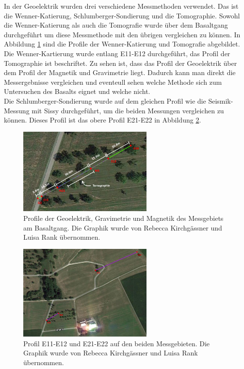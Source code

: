 
In der Geoelektrik wurden drei verschiedene Messmethoden verwendet. Das ist die Wenner-Katierung, Schlumberger-Sondierung und die Tomographie. Sowohl die Wenner-Katierung als auch die Tomografie wurde über dem Basaltgang durchgeführt um diese Messmethode mit den übrigen vergleichen zu können. In Abbildung \ref{abb:PBasalt} sind die Profile der Wenner-Katierung und Tomografie abgebildet. Die Wenner-Kartierung wurde entlang E11-E12 durchgeführt, das Profil der Tomographie ist beschriftet. Zu sehen ist, dass das Profil der Geoelektrik über dem Profil der Magnetik und Gravimetrie liegt. Dadurch kann man direkt die Messergebnisse vergleichen und eventeull sehen welche Methode sich zum Untersuchen des Basalts eignet und welche nicht.\\
Die Schlumberger-Sondierung wurde auf dem gleichen Profil wie die Seismik-Messung mit Sissy durchgeführt, um die beiden Messungen vergleichen zu können. Dieses Profil ist das obere Profil E21-E22 in Abbildung \ref{abb:PWiese}.


\begin{figure}[h]
\centering
\includegraphics[width=0.6\textwidth]{fig/ElektrikMagnetikGravimetrie0gps.png}
\caption[Profile der Geoelektrik, Gravimetrie und Magnetik des Messgebiets am Basaltgang]{Profile der Geoelektrik, Gravimetrie und Magnetik des Messgebiets am Basaltgang. Die Graphik wurde von Rebecca Kirchgässner und Luisa Rank übernommen.}
\label{abb:PBasalt}
\end{figure}

\begin{figure}[h]
\centering
\includegraphics[width=0.6\textwidth]{fig/profilegps.PNG}
\caption[Profil E11-E12 und E21-E22 auf den beiden Messgebieten]{Profil E11-E12 und E21-E22 auf den beiden Messgebieten. Die Graphik wurde von Rebecca Kirchgässner und Luisa Rank übernommen.}
\label{abb:PWiese}
\end{figure}
\newpage

